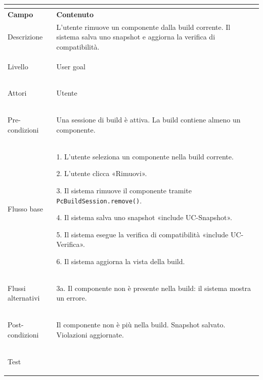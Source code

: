 \documentclass[11pt, a4paper]{article}
\begin{document}
\vspace{10pt}




\noindent

\begin{tabularx}{\textwidth}{|>{\bfseries}p{3.8cm}|X|}

\hline

\multicolumn{2}{|l|}{\textbf{UC3 --- Rimuovi componente}} \\

\hline

Campo & \textbf{Contenuto} \\

\hline

Descrizione & L'utente rimuove un componente dalla build corrente. Il sistema salva uno snapshot e aggiorna la verifica di compatibilità. \\

\hline

Livello & User goal \\

\hline

Attori & Utente \\

\hline

Pre-condizioni & Una sessione di build è attiva. La build contiene almeno un componente. \\

\hline

Flusso base & 

1. L'utente seleziona un componente nella build corrente.\newline

2. L'utente clicca «Rimuovi».\newline

3. Il sistema rimuove il componente tramite \texttt{PcBuildSession.remove()}.\newline

4. Il sistema salva uno snapshot «include UC-Snapshot».\newline

5. Il sistema esegue la verifica di compatibilità «include UC-Verifica».\newline

6. Il sistema aggiorna la vista della build. \\

\hline

Flussi alternativi & 3a. Il componente non è presente nella build: il sistema mostra un errore. \\

\hline

Post-condizioni & Il componente non è più nella build. Snapshot salvato. Violazioni aggiornate. \\

\hline

Test & \\

\hline

\end{tabularx}
\end{document}
